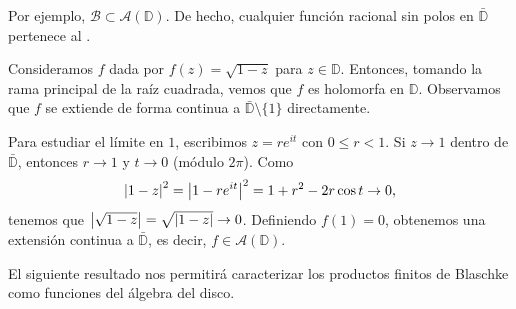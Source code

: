 Por ejemplo, $\mathscr{B} \subset \mathscr{A}(\mathbb{D})$. De hecho, cualquier función racional sin polos en $\bar{\mathbb{D}}$ pertenece al .

\begin{ejem}
    Consideramos $f$ dada por $f(z) = \sqrt{1-z}$ para $z \in \mathbb{D}$. Entonces, tomando la rama principal de la raíz cuadrada, vemos que $f$ es holomorfa en $\mathbb{D}$. Observamos que $f$ se extiende de forma continua a $\bar{\mathbb{D}} \setminus \{1\}$ directamente.

    Para estudiar el límite en $1$, escribimos $z = re^{it}$ con $0 \leq r < 1$. Si $z \to 1$ dentro de $\bar{\mathbb{D}}$, entonces $r \to 1$ y $t \to 0$ (módulo $2\pi$). Como
    \[
    \left|1-z\right|^2 = \left|1-re^{it}\right|^2 = 1+r^2-2r\cos t \to 0,
    \]
    tenemos que $\left|\sqrt{1-z}\right| = \sqrt{\left|1-z\right|} \to 0$. Definiendo $f(1)=0$, obtenemos una extensión continua a $\bar{\mathbb{D}}$, es decir, $f \in \mathscr{A}(\mathbb{D})$.
\end{ejem}

El siguiente resultado nos permitirá caracterizar los productos finitos de Blaschke como funciones del álgebra del disco.


